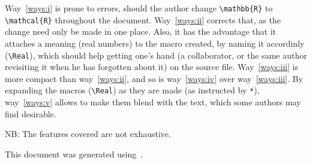 \documentclass{article}
\providecommand\docways[1]{way~\ref{ways:#1}}
\providecommand\docWays[1]{Way~\ref{ways:#1}}
\begin{document}
\docWays{i} is prone to errors, should the author change \verb+\mathbb{R}+ to \verb+\mathcal{R}+ throughout the document.
\docWays{ii} corrects that, as the change need only be made in one place.
Also, it has the advantage that it attaches a meaning (real numbers) to the macro created,
by naming it accordinly (\verb|\Real|), which should help getting one's hand (a collaborator,
or the same author revisiting it when he has forgotten about it) on the source file.
\docWays{iii} is more compact than  \docways{ii}, and so is 
\docways{iv} over \docways{iii}.
By expanding the macros (\verb+\Real+) as they are made (as instructed by \verb+*+), \docways{v} allows to
make them blend with the text, which some authors may find desirable.

NB: The features covered are not exhaustive.

This document was generated using~\CcoolVers.

{}
\printbibliography[heading=subbibliography]
\end{document}
